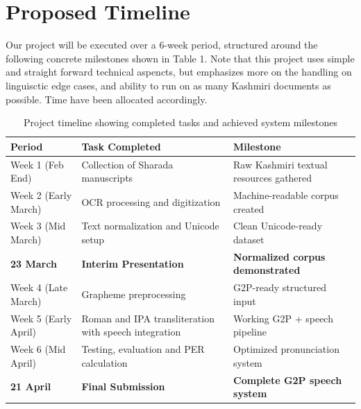 \documentclass[11pt]{article}
\begin{document}
\section{Proposed Timeline}
Our project will be executed over a 6-week period, structured around the following concrete milestones shown in Table 1. Note that this project uses simple and straight forward technical aspencts, but emphasizes more on the handling on linguisctic edge cases, and ability to run on as many Kashmiri documents as possible.
Time have been allocated accordingly.  
\begin{table}[t]

\small
\setlength{\tabcolsep}{3pt}

\begin{tabular}{p{2.6cm} p{3.6cm} p{3.8cm}}
\hline
\textbf{Period} & \textbf{Task Completed} & \textbf{Milestone} \\
\hline

Week 1 (Feb End)
& Collection of Sharada manuscripts
& Raw Kashmiri textual resources gathered \\

Week 2 (Early March)
& OCR processing and digitization
& Machine-readable corpus created \\

Week 3 (Mid March)
& Text normalization and Unicode setup
& Clean Unicode-ready dataset \\

\textbf{23 March}
& \textbf{Interim Presentation}
& \textbf{Normalized corpus demonstrated} \\

Week 4 (Late March)
& Grapheme preprocessing
& G2P-ready structured input \\

Week 5 (Early April)
& Roman and IPA transliteration with speech integration
& Working G2P + speech pipeline \\

Week 6 (Mid April)
& Testing, evaluation and PER calculation
& Optimized pronunciation system \\

\textbf{21 April}
& \textbf{Final Submission}
& \textbf{Complete G2P speech system} \\

\hline
\end{tabular}

\caption{Project timeline showing completed tasks and achieved system milestones}
\end{table}
\end{document}

